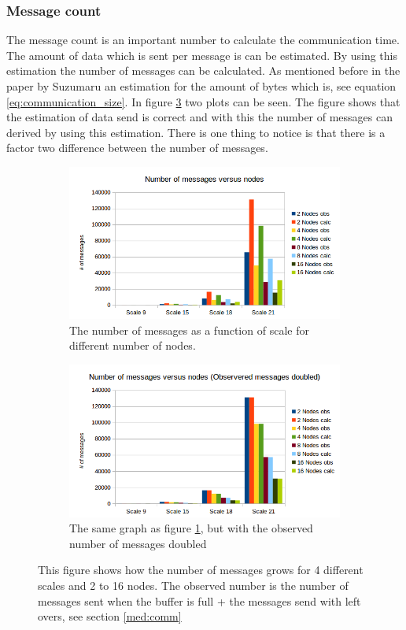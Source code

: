 \subsubsection{Message count}
The message count is an important number to calculate the communication time. The amount of data which is sent per message is can be estimated. By using this estimation the number of messages can be calculated. As mentioned before in the paper by Suzumaru\cite{suzumura2011performance} an estimation for the amount of bytes which is, see equation \ref{eq:communication_size}. In figure \ref{fig:das_scale_messages} two plots can be seen. The figure shows that the estimation of data send is correct and with this the number of messages can derived by using this estimation. There is one thing to notice is that there is a factor two difference between the number of messages.
\begin{figure}[!h]
\centering
\begin{subfigure}{.5\textwidth}
  \centering
  \includegraphics[width=\linewidth]{images/scale_vs_messages.png}
  \caption{The number of messages as a function of scale for different number of nodes.}
  \label{fig:scale_messages}
\end{subfigure}%
\begin{subfigure}{.5\textwidth}
  \centering
  \includegraphics[width=\linewidth]{images/scale_vs_messages_doubled.png}
  \caption{The same graph as figure \ref{fig:scale_messages}, but with the observed number of messages doubled}
  \label{fig:scale_messages_doubled}
\end{subfigure}
\caption{This figure shows how the number of messages grows for 4 different scales and 2 to 16 nodes. The observed number is the number of messages sent when the buffer is full + the messages send with left overs, see section \ref{med:comm}}
\label{fig:das_scale_messages}
\end{figure}